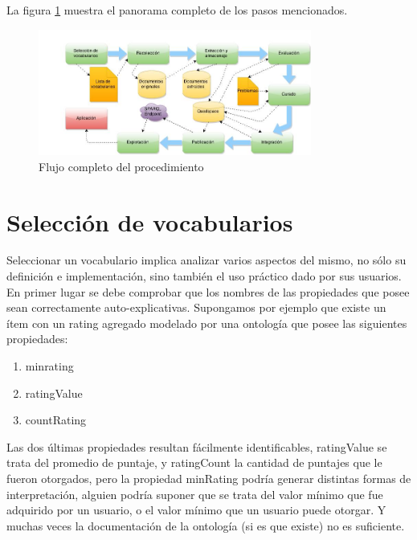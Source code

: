 La figura \ref{figure:procflujo} muestra el panorama completo de los pasos mencionados.
\begin{figure}
    \centering
    \includegraphics[width=0.8\textwidth,natwidth=610,natheight=642]{proceso}
    \caption{Flujo completo del procedimiento}
    \label{figure:procflujo}
\end{figure}


\section{Selección de vocabularios}

\noindent Seleccionar un vocabulario implica analizar varios aspectos del mismo, no sólo su definición e implementación, sino también el uso práctico dado por sus usuarios. 
En primer lugar se debe comprobar que los nombres de las propiedades que posee sean correctamente auto-explicativas. Supongamos por ejemplo que existe un ítem con un rating agregado modelado por una ontología que posee las siguientes propiedades:

\begin{enumerate}
\item minrating
\item ratingValue
\item countRating
\end{enumerate}


\noindent Las dos últimas propiedades resultan fácilmente identificables, ratingValue se trata del promedio de puntaje, y ratingCount 
la cantidad de puntajes que le fueron otorgados, pero la propiedad minRating podría generar distintas formas de interpretación, 
alguien podría suponer que se trata del valor mínimo que fue adquirido por un usuario, o el valor mínimo que un usuario puede 
otorgar. Y muchas veces la documentación de la ontología (si es que existe) no es suficiente.
\\\\

